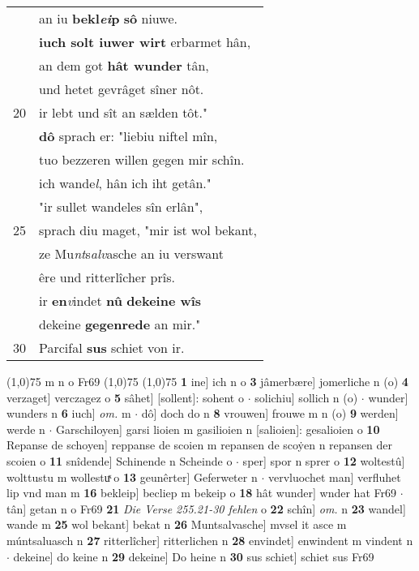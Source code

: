 \documentclass[8pt,a4paper,notitlepage]{article}
\begin{document}
\begin{table}[ht]
\begin{minipage}[t]{0.5\linewidth}
\begin{tabular}{rl}
 & an iu \textbf{bekl\textit{ei}p} \textbf{sô} niuwe.\\ 
 & \textbf{iuch solt iuwer wirt} erbarmet hân,\\ 
 & an dem got \textbf{hât wunder} tân,\\ 
 & und hetet gevrâget sîner nôt.\\ 
20 & ir lebt und sît an sælden tôt."\\ 
 & \textbf{dô} sprach er: "liebiu niftel mîn,\\ 
 & tuo bezzeren willen gegen mir schîn.\\ 
 & ich wande\textit{l}, hân ich iht getân."\\ 
 & "ir sullet wandeles sîn erlân",\\ 
25 & sprach diu maget, "mir ist wol bekant,\\ 
 & ze Mu\textit{nt}s\textit{alv}asche an iu verswant\\ 
 & êre und ritterlîcher prîs.\\ 
 & ir \textbf{en}\textit{v}indet \textbf{nû} \textbf{dekeine wîs}\\ 
 & dekeine \textbf{gegenrede} an mir."\\ 
30 & Parcifal \textbf{sus} schiet von ir.\\ 
\end{tabular}
\scriptsize
\line(1,0){75} \newline
m n o Fr69 \newline
\line(1,0){75} \newline
\newline
\line(1,0){75} \newline
\textbf{1} ine] ich n o \textbf{3} jâmerbære] jomerliche n (o) \textbf{4} verzaget] verczagez o \textbf{5} sâhet] [sollent]: sohent o  $\cdot$ solichiu] sollich n (o)  $\cdot$ wunder] wunders n \textbf{6} iuch] \textit{om.} m  $\cdot$ dô] doch do n \textbf{8} vrouwen] frouwe m n (o) \textbf{9} werden] werde n  $\cdot$ Garschiloyen] garsi lioien m gasilioien n [salioien]: gesalioien o \textbf{10} Repanse de schoyen] reppanse de scoien m repansen de scoẏen n repansen der scoien o \textbf{11} snîdende] Schinende n Scheinde o  $\cdot$ sper] spor n sprer o \textbf{12} woltestû] wolttustu m wollestuͯ o \textbf{13} geunêrter] Geferweter n  $\cdot$ vervluochet man] verfluhet lip vnd man m \textbf{16} bekleip] becliep m bekeip o \textbf{18} hât wunder] wnder hat Fr69  $\cdot$ tân] getan n o Fr69 \textbf{21} \textit{Die Verse 255.21-30 fehlen} o  \textbf{22} schîn] \textit{om.} n \textbf{23} wandel] wande m \textbf{25} wol bekant] bekat n \textbf{26} Muntsalvasche] mvsel it asce m múntsaluasch n \textbf{27} ritterlîcher] ritterlichen n \textbf{28} envindet] enwindent m vindent n  $\cdot$ dekeine] do keine n \textbf{29} dekeine] Do heine n \textbf{30} sus schiet] schiet sus Fr69 \newline
\end{minipage}
\end{table}
\end{document}

